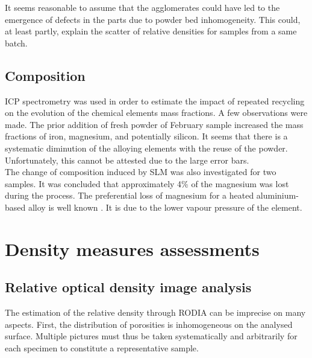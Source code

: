  It seems reasonable to assume that the agglomerates could have led to the emergence of defects in the parts due to powder bed inhomogeneity. This could, at least partly, explain the scatter of relative densities for samples from a same batch. %
\subsection{Composition}

ICP spectrometry was used in order to estimate the impact of repeated recycling on the evolution of the chemical elements mass fractions. A few observations were made. The prior addition of fresh powder of February sample increased the mass fractions of iron, magnesium, and potentially silicon. It seems that there is a systematic diminution of the alloying elements with the reuse of the powder. Unfortunately, this cannot be attested due to the large error bars.\\

The change of composition induced by SLM was also investigated for two samples. It was concluded that approximately 4\% of the magnesium was lost during the process. The preferential loss of magnesium for a heated aluminium-based alloy is well known \parencite{HIDVEGI197739}. It is due to the lower vapour pressure of the element. %
\section{Density measures assessments}
\label{DDMA}



\subsection{Relative optical density image analysis}
\label{DRODIA}

The estimation of the relative density through RODIA can be imprecise on many aspects. First, the distribution of porosities is inhomogeneous on the analysed surface. Multiple pictures must thus be taken systematically and arbitrarily for each specimen to constitute a representative sample.\\

